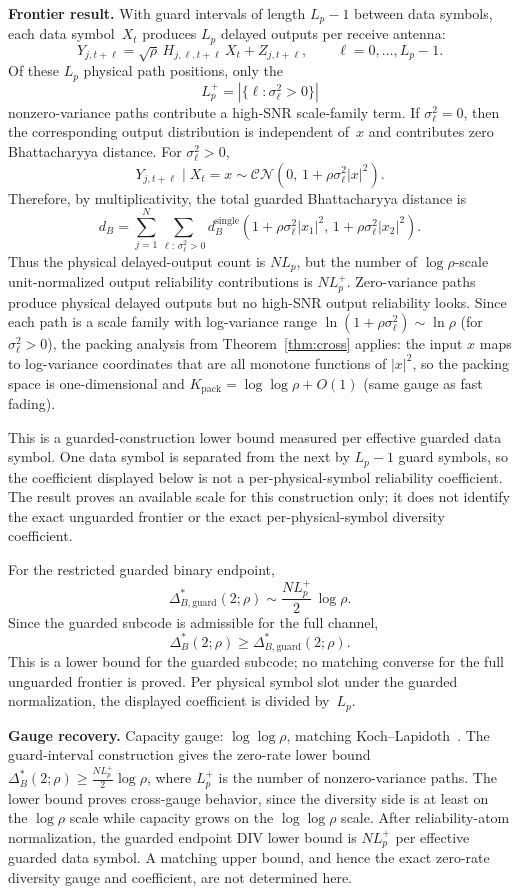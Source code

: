 \documentclass[lettersize,onecolumn]{IEEEtran}
\newcommand{\snr}{\rho}
\begin{document}
\textbf{Frontier result.}
With guard intervals of length $L_p-1$ between data symbols,
each data symbol~$X_t$ produces $L_p$ delayed outputs per receive
antenna:
\[
Y_{j,t+\ell} = \sqrt{\snr}\,H_{j,\ell,t+\ell}\,X_t + Z_{j,t+\ell},
\qquad \ell = 0,\dots,L_p-1.
\]
Of these $L_p$ physical path positions, only the
\[
L_p^+ = |\{\ell : \sigma_\ell^2 > 0\}|
\]
nonzero-variance paths contribute a high-SNR scale-family term. If
$\sigma_\ell^2 = 0$, then the corresponding output distribution is
independent of~$x$ and contributes zero Bhattacharyya distance. For
$\sigma_\ell^2 > 0$,
\[
Y_{j,t+\ell} \mid X_t = x
\sim \mathcal{CN}(0,\,1+\snr\sigma_\ell^2|x|^2).
\]
Therefore, by multiplicativity, the total guarded Bhattacharyya
distance is
\[
d_B = \sum_{j=1}^{N}\sum_{\ell:\,\sigma_\ell^2>0}
d_B^{\mathrm{single}}(1+\snr\sigma_\ell^2|x_1|^2,\,
1+\snr\sigma_\ell^2|x_2|^2).
\]
Thus the physical delayed-output count is $NL_p$, but the number of
$\log\snr$-scale unit-normalized output reliability contributions is
$NL_p^+$. Zero-variance paths produce physical delayed outputs but no
high-SNR output reliability looks.
Since each path is a scale family with log-variance range
$\ln(1 + \snr\sigma_\ell^2) \sim \ln\snr$ (for
$\sigma_\ell^2 > 0$), the packing analysis from
Theorem~\ref{thm:cross} applies: the input $x$ maps to
log-variance coordinates that are all monotone functions of
$|x|^2$, so the packing space is one-dimensional and
$K_{\mathrm{pack}} = \log\log\snr + O(1)$ (same gauge as
fast fading).

This is a guarded-construction lower bound measured per effective
guarded data symbol. One data symbol is separated from the next by
$L_p-1$ guard symbols, so the coefficient displayed below is not a
per-physical-symbol reliability coefficient. The result proves an available scale for this construction only; it
does not identify the exact unguarded frontier or the exact
per-physical-symbol diversity coefficient.

For the restricted guarded binary endpoint,
\[
  \Delta_{B,\mathrm{guard}}^*(2;\snr)
  \sim \frac{NL_p^+}{2}\,\log\snr.
\]
Since the guarded subcode is admissible for the full channel,
\[
  \Delta_B^*(2;\snr) \ge \Delta_{B,\mathrm{guard}}^*(2;\snr).
\]
This is a lower bound for the guarded subcode; no matching converse
for the full unguarded frontier is proved. Per physical
symbol slot under the guarded normalization, the displayed coefficient
is divided by~$L_p$.

\textbf{Gauge recovery.}
Capacity gauge: $\log\log\snr$, matching
Koch--Lapidoth~\cite{KochLapidoth2009}. The guard-interval
construction gives the zero-rate lower bound
$\Delta_B^*(2;\snr) \ge \frac{NL_p^+}{2}\log\snr$,
where $L_p^+$ is the number of nonzero-variance paths. The lower bound proves cross-gauge behavior, since the diversity
side is at least on the $\log\snr$ scale while capacity grows on
the $\log\log\snr$ scale. After reliability-atom normalization, the
guarded endpoint DIV lower bound is $NL_p^+$ per
effective guarded data symbol. A matching upper bound, and hence the
exact zero-rate diversity gauge and coefficient, are not determined
here.
\end{document}
